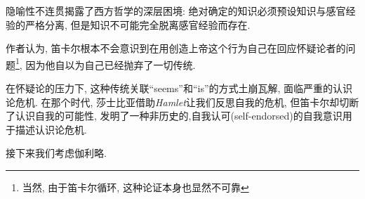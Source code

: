 \documentclass[12pt, a4paper, oneside]{ctexart}
\newcommand{\f}{\footnote}
\begin{document}
隐喻性不连贯揭露了西方哲学的深层困境: 绝对确定的知识必须预设知识与感官经验的严格分离, 但是知识不可能完全脱离感官经验而存在.

作者认为, 笛卡尔根本不会意识到在用创造上帝这个行为自己在回应怀疑论者的问题\f{当然, 由于笛卡尔循环, 这种论证本身也显然不可靠}, 因为他自以为自己已经抛弃了一切传统.

在怀疑论的压力下, 这种传统关联``seems''和``is''的方式土崩瓦解, 面临严重的认识论危机. 在那个时代, 莎士比亚借助\textit{Hamlet}让我们反思自我的危机, 但笛卡尔却切断了认识自我的可能性, 发明了一种非历史的,自我认可(self-endorsed)的自我意识用于描述认识论危机.

接下来我们考虑伽利略. 

\end{document}
